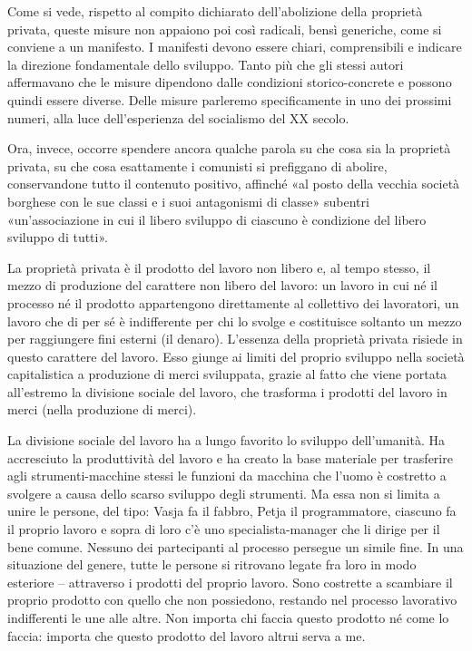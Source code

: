 \documentclass[../main]{subfiles}
\begin{document}
Come si vede, rispetto al compito dichiarato dell'abolizione della proprietà privata, queste misure non appaiono poi così radicali, bensì generiche, come si conviene a un manifesto. I manifesti devono essere chiari, comprensibili e indicare la direzione fondamentale dello sviluppo. Tanto più che gli stessi autori affermavano che le misure dipendono dalle condizioni storico-concrete e possono quindi essere diverse. Delle misure parleremo specificamente in uno dei prossimi numeri, alla luce dell'esperienza del socialismo del XX secolo.

Ora, invece, occorre spendere ancora qualche parola su che cosa sia la proprietà privata, su che cosa esattamente i comunisti si prefiggano di abolire, conservandone tutto il contenuto positivo, affinché «al posto della vecchia società borghese con le sue classi e i suoi antagonismi di classe» subentri «un'associazione in cui il libero sviluppo di ciascuno è condizione del libero sviluppo di tutti».

La proprietà privata è il prodotto del lavoro non libero e, al tempo stesso, il mezzo di produzione del carattere non libero del lavoro: un lavoro in cui né il processo né il prodotto appartengono direttamente al collettivo dei lavoratori, un lavoro che di per sé è indifferente per chi lo svolge e costituisce soltanto un mezzo per raggiungere fini esterni (il denaro). L'essenza della proprietà privata risiede in questo carattere del lavoro. Esso giunge ai limiti del proprio sviluppo nella società capitalistica a produzione di merci sviluppata, grazie al fatto che viene portata all'estremo la divisione sociale del lavoro, che trasforma i prodotti del lavoro in merci (nella produzione di merci).

La divisione sociale del lavoro ha a lungo favorito lo sviluppo dell'umanità. Ha accresciuto la produttività del lavoro e ha creato la base materiale per trasferire agli strumenti-macchine stessi le funzioni da macchina che l'uomo è costretto a svolgere a causa dello scarso sviluppo degli strumenti. Ma essa non si limita a unire le persone, del tipo: Vasja fa il fabbro, Petja il programmatore, ciascuno fa il proprio lavoro e sopra di loro c'è uno specialista-manager che li dirige per il bene comune. Nessuno dei partecipanti al processo persegue un simile fine. In una situazione del genere, tutte le persone si ritrovano legate fra loro in modo esteriore – attraverso i prodotti del proprio lavoro. Sono costrette a scambiare il proprio prodotto con quello che non possiedono, restando nel processo lavorativo indifferenti le une alle altre. Non importa chi faccia questo prodotto né come lo faccia: importa che questo prodotto del lavoro altrui serva a me.
\end{document}
